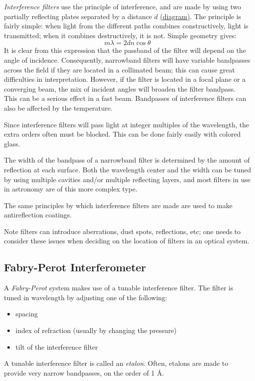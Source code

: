 \documentclass[12pt]{article}
\begin{document}
\textit{Interference filters} use the principle of interference, and are made
by using two partially reflecting plates separated by a distance $d$
\href{http://astronomy.nmsu.edu/holtz/a535/html/diagrams/a535/intfilt.htm}
{(diagram)}. The principle is fairly simple: when light from the different
paths combines constructively, light is transmitted; when it combines
destructively, it is not. Simple geometry gives:
\[
    m\lambda = 2dn\cos\theta
    \]
It is clear from this expression that the passband of the filter will
depend on the angle of incidence. Consequently, narrowband filters will
have variable bandpasses across the field if they are located in a
collimated beam; this can cause great difficulties in interpretation.
However, if the filter is located in a focal plane or a converging beam,
the mix of incident angles will broaden the filter bandpass.
This can be a serious effect in a fast beam. Bandpasses of
interference filters can also be affected by the temperature.

Since interference filters will pass light at integer multiples of the
wavelength, the extra orders often must be blocked. This can be done
fairly easily with colored glass.

The width of the bandpass of a narrowband filter is determined by the
amount of reflection at each surface. Both the wavelength center and
the width can be tuned by using multiple cavities and/or multiple
reflecting layers, and most filters in use in astronomy are of this
more complex type.

The same principles by which interference filters are made are used to
make antireflection coatings.

Note filters can introduce aberrations, dust spots, reflections, etc;
one needs to consider these issues when deciding on the location of
filters in an optical system.

\subsection{Fabry-Perot Interferometer}
A \textit{Fabry-Perot} system makes use of a tunable interference filter. The
filter is tuned in wavelength by adjusting one of the following:
\begin{itemize}
    \item spacing
    \item index of refraction (usually by changing the pressure)
    \item tilt of the interference filter
\end{itemize}
A tunable interference filter is called an \textit{etalon}.
Often, etalons are
made to provide very narrow bandpasses, on the order of 1 \AA{}.
\end{document}
